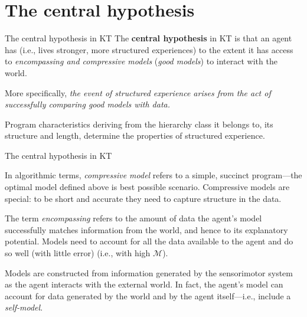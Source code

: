 \section{The central hypothesis}

\begin{frame}[label=ladila]{The central hypothesis in KT}
The {\bf central hypothesis} in KT is that an agent has \SEP (i.e., lives stronger, more structured experiences) to the extent it has access to {\em encompassing and compressive models} ({\em good models}) to interact with the world.  \vfill

More specifically,  {\em the event  of structured experience  arises from the act of successfully comparing  good models with data. }   \vfill

{Program characteristics deriving from  the hierarchy class it belongs to, its structure and  length, determine the properties of structured experience. }


\end{frame}

\begin{frame}[label=ladila]{The central hypothesis in KT}
 
   In algorithmic terms, {\em compressive model} refers to a simple, succinct program---the optimal model defined above is best possible scenario. Compressive models are special: to be short and accurate they need to capture structure in the data.   \vfill
    
      The term {\em encompassing} refers to the amount of data  the agent's model successfully matches information from the world, and hence to its explanatory potential.   Models need to account for all the data available  to the agent  and do so well (with little error) (i.e., with high $\mathcal M$).\vfill
    
    Models are constructed from information generated by the sensorimotor system as the agent interacts with the external world. In fact, the agent's model can account for data generated by the world and by the agent itself---i.e., include a {\em self-model}.
    
 
\end{frame}